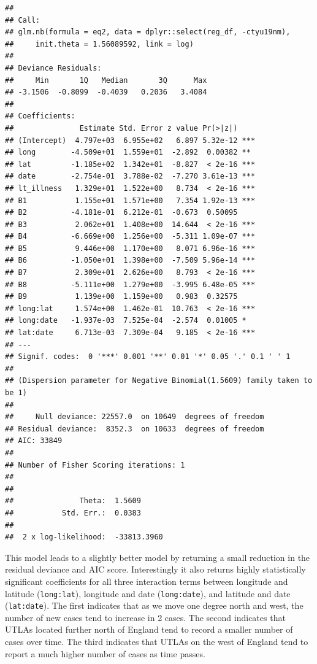\documentclass[
]{book}
\begin{document}
\begin{verbatim}
## 
## Call:
## glm.nb(formula = eq2, data = dplyr::select(reg_df, -ctyu19nm), 
##     init.theta = 1.56089592, link = log)
## 
## Deviance Residuals: 
##     Min       1Q   Median       3Q      Max  
## -3.1506  -0.8099  -0.4039   0.2036   3.4084  
## 
## Coefficients:
##               Estimate Std. Error z value Pr(>|z|)    
## (Intercept)  4.797e+03  6.955e+02   6.897 5.32e-12 ***
## long        -4.509e+01  1.559e+01  -2.892  0.00382 ** 
## lat         -1.185e+02  1.342e+01  -8.827  < 2e-16 ***
## date        -2.754e-01  3.788e-02  -7.270 3.61e-13 ***
## lt_illness   1.329e+01  1.522e+00   8.734  < 2e-16 ***
## B1           1.155e+01  1.571e+00   7.354 1.92e-13 ***
## B2          -4.181e-01  6.212e-01  -0.673  0.50095    
## B3           2.062e+01  1.408e+00  14.644  < 2e-16 ***
## B4          -6.669e+00  1.256e+00  -5.311 1.09e-07 ***
## B5           9.446e+00  1.170e+00   8.071 6.96e-16 ***
## B6          -1.050e+01  1.398e+00  -7.509 5.96e-14 ***
## B7           2.309e+01  2.626e+00   8.793  < 2e-16 ***
## B8          -5.111e+00  1.279e+00  -3.995 6.48e-05 ***
## B9           1.139e+00  1.159e+00   0.983  0.32575    
## long:lat     1.574e+00  1.462e-01  10.763  < 2e-16 ***
## long:date   -1.937e-03  7.525e-04  -2.574  0.01005 *  
## lat:date     6.713e-03  7.309e-04   9.185  < 2e-16 ***
## ---
## Signif. codes:  0 '***' 0.001 '**' 0.01 '*' 0.05 '.' 0.1 ' ' 1
## 
## (Dispersion parameter for Negative Binomial(1.5609) family taken to be 1)
## 
##     Null deviance: 22557.0  on 10649  degrees of freedom
## Residual deviance:  8352.3  on 10633  degrees of freedom
## AIC: 33849
## 
## Number of Fisher Scoring iterations: 1
## 
## 
##               Theta:  1.5609 
##           Std. Err.:  0.0383 
## 
##  2 x log-likelihood:  -33813.3960
\end{verbatim}

This model leads to a slightly better model by returning a small reduction in the residual deviance and AIC score. Interestingly it also returns highly statistically significant coefficients for all three interaction terms between longitude and latitude (\texttt{long:lat}), longitude and date (\texttt{long:date}), and latitude and date (\texttt{lat:date}). The first indicates that as we move one degree north and west, the number of new cases tend to increase in 2 cases. The second indicates that UTLAs located further north of England tend to record a smaller number of cases over time. The third indicates that UTLAs on the west of England tend to report a much higher number of cases as time passes.
\end{document}
